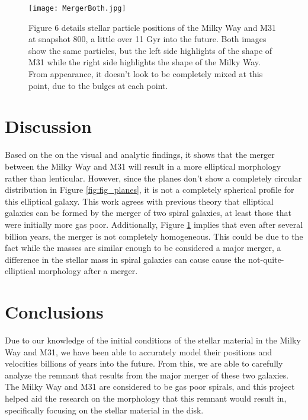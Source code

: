 \documentclass{aastex63}
\begin{document}
\begin{figure}
    \centering
    \texttt{[image: MergerBoth.jpg]}
    \caption{Figure 6 details stellar particle positions of the Milky Way and M31 at snapshot 800, a little over 11 Gyr into the future. Both images show the same particles, but the left side highlights of the shape of M31 while the right side highlights the shape of the Milky Way. From appearance, it doesn't look to be completely mixed at this point, due to the bulges at each point.}
    \label{fig:fig_6}
\end{figure}

\medskip

\section{Discussion}
Based on the on the visual and analytic findings, it shows that the merger between the Milky Way and M31 will result in a more elliptical morphology rather than lenticular. However, since the planes don't show a completely circular distribution in Figure \ref{fig:fig_planes}, it is not a completely spherical profile for this elliptical galaxy. This work agrees with previous theory that elliptical galaxies can be formed by the merger of two spiral galaxies, at least those that were initially more gas poor. Additionally, Figure \ref{fig:fig_6} implies that even after several billion years, the merger is not completely homogeneous. This could be due to the fact while the masses are similar enough to be considered a major merger, a difference in the stellar mass in spiral galaxies can cause cause the not-quite-elliptical morphology after a merger. 

\section{Conclusions}

Due to our knowledge of the initial conditions of the stellar material in the Milky Way and M31, we have been able to accurately model their positions and velocities billions of years into the future. From this, we are able to carefully analyze the remnant that results from the major merger of these two galaxies. The Milky Way and M31 are considered to be gas poor spirals, and this project helped aid the research on the morphology that this remnant would result in, specifically focusing on the stellar material in the disk. 

\medskip
\end{document}
